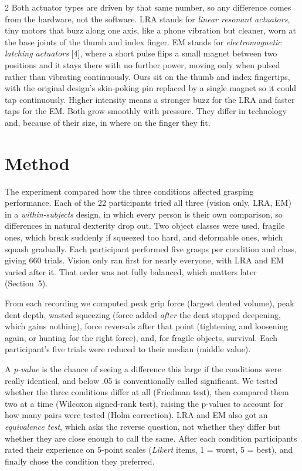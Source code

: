 \documentclass[a4paper, 12pt]{article}
\begin{document}
\begin{multicols}{2}
  Both actuator types are driven by that same number, so any difference comes from the
  hardware, not the software. LRA stands for \emph{linear resonant actuators}, tiny motors
  that buzz along one axis, like a phone vibration but cleaner, worn at the base joints of
  the thumb and index finger. EM stands for \emph{electromagnetic latching actuators} [4],
  where a short pulse flips a small magnet between two positions and it stays there with no
  further power, moving only when pulsed rather than vibrating continuously. Ours sit on the
  thumb and index fingertips, with the original design's skin-poking pin replaced by a single
  magnet so it could tap continuously. Higher intensity means a stronger buzz for the LRA and
  faster taps for the EM. Both grow smoothly with pressure. They differ in technology and,
  because of their size, in where on the finger they fit.

  \section{Method}

  The experiment compared how the three conditions affected grasping performance. Each of the
  22 participants tried all three (vision only, LRA, EM) in a \emph{within-subjects} design, in
  which every person is their own comparison, so differences in natural dexterity drop out.
  Two object classes were used, fragile ones, which break suddenly if squeezed too hard, and
  deformable ones, which squash gradually. Each participant performed five grasps per condition
  and class, giving 660 trials. Vision only ran first for nearly everyone, with LRA and EM
  varied after it. That order was not fully balanced, which matters later (Section~5).

  From each recording we computed peak grip force (largest dented volume), peak dent depth,
  wasted squeezing (force added \emph{after} the dent stopped deepening, which gains
  nothing), force reversals after that point (tightening and loosening again, or hunting for
  the right force), and, for fragile objects, survival. Each participant's five trials were
  reduced to their median (middle value).

  A \emph{p-value} is the chance of seeing a difference this large if the conditions were
  really identical, and below .05 is conventionally called significant. We tested whether the
  three conditions differ at all (Friedman test), then compared them two at a time (Wilcoxon
  signed-rank test), raising the p-values to account for how many pairs were tested (Holm
  correction). LRA and EM also got an \emph{equivalence test}, which asks the reverse
  question, not whether they differ but whether they are close enough to call the same. After
  each condition participants rated their experience on 5-point scales (\emph{Likert} items,
  1 = worst, 5 = best), and finally chose the condition they preferred.


\end{multicols}
\end{document}
